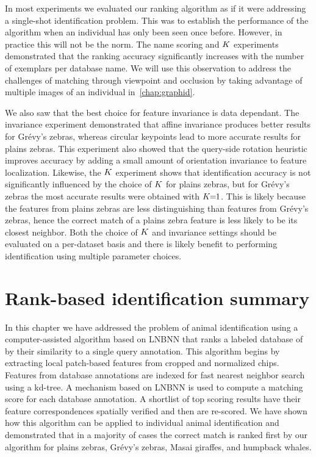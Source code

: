         In most experiments we evaluated our ranking algorithm as if it were addressing a single-shot
        identification problem. This was to establish the performance of the algorithm when an individual has only
        been seen once before. However, in practice this will not be the norm. The name scoring and $K$
        experiments demonstrated that the ranking accuracy significantly increases with the number of exemplars per
        database name. We will use this observation to address the challenges of matching through viewpoint and
        occlusion by taking advantage of multiple images of an individual in~\cref{chap:graphid}.

        We also saw that the best choice for feature invariance is data dependant. The invariance experiment
        demonstrated that affine invariance produces better results for Grévy's zebras, whereas circular keypoints
        lead to more accurate results for plains zebras. This experiment also showed that the query-side rotation
        heuristic improves accuracy by adding a small amount of orientation invariance to feature localization.
        Likewise, the $K$ experiment shows that identification accuracy is not significantly influenced by the
        choice of $K$ for plains zebras, but for Grévy's zebras the most accurate results were obtained with
        $K\mkern-6mu=\mkern-6mu1$. This is likely because the features from plains zebras are less distinguishing than features
        from Grévy's zebras, hence the correct match of a plains zebra feature is less likely to be its closest
        neighbor. Both the choice of $K$ and invariance settings should be evaluated on a per-dataset basis and
        there is likely benefit to performing identification using multiple parameter choices.


\section{Rank-based identification summary}\label{sec:staticsum}

    In this chapter we have addressed the problem of animal identification using a computer-assisted algorithm
    based on LNBNN that ranks a labeled database of \names{} by their similarity to a single query annotation. This
    algorithm begins by extracting local patch-based features from cropped and normalized chips. Features from
    database annotations are indexed for fast nearest neighbor search using a kd-tree. A mechanism based on LNBNN
    is used to compute a matching score for each database annotation. A shortlist of top scoring results have their
    feature correspondences spatially verified and then are re-scored. We have shown how this algorithm can be
    applied to individual animal identification and demonstrated that in a majority of cases the correct match is
    ranked first by our algorithm for plains zebras, Grévy's zebras, Masai giraffes, and humpback whales.

